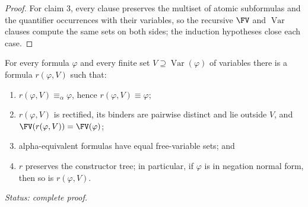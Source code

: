 \begin{proof}
For claim 3, every clause preserves the multiset of atomic subformulas
and the quantifier occurrences with their variables, so the recursive
\(\FV\) and \(\operatorname{Var}\) clauses compute the same sets on both
sides; the induction hypotheses close each case.
\end{proof}

\begin{lemma}
\label{lem:rectified-variant}
For every formula \(\varphi\) and every finite set
\(V\supseteq\operatorname{Var}(\varphi)\) of variables there is a formula
\(r(\varphi,V)\) such that:
\begin{enumerate}
  \item \(r(\varphi,V)\equiv_\alpha\varphi\), hence
        \(r(\varphi,V)\equiv\varphi\);
  \item \(r(\varphi,V)\) is rectified, its binders are pairwise distinct
        and lie outside \(V\), and
        \(\FV(r(\varphi,V))=\FV(\varphi)\);
  \item alpha-equivalent formulas have equal free-variable sets; and
  \item \(r\) preserves the constructor tree; in particular, if
        \(\varphi\) is in negation normal form, then so is
        \(r(\varphi,V)\).
\end{enumerate}
\textit{Status: complete proof.}
\end{lemma}
